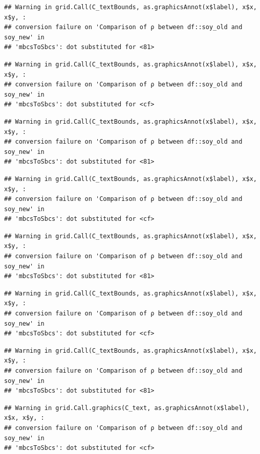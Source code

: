 \documentclass[
]{book}
\begin{document}
\begin{verbatim}
## Warning in grid.Call(C_textBounds, as.graphicsAnnot(x$label), x$x, x$y, :
## conversion failure on 'Comparison of ρ between df::soy_old and soy_new' in
## 'mbcsToSbcs': dot substituted for <81>
\end{verbatim}

\begin{verbatim}
## Warning in grid.Call(C_textBounds, as.graphicsAnnot(x$label), x$x, x$y, :
## conversion failure on 'Comparison of ρ between df::soy_old and soy_new' in
## 'mbcsToSbcs': dot substituted for <cf>
\end{verbatim}

\begin{verbatim}
## Warning in grid.Call(C_textBounds, as.graphicsAnnot(x$label), x$x, x$y, :
## conversion failure on 'Comparison of ρ between df::soy_old and soy_new' in
## 'mbcsToSbcs': dot substituted for <81>
\end{verbatim}

\begin{verbatim}
## Warning in grid.Call(C_textBounds, as.graphicsAnnot(x$label), x$x, x$y, :
## conversion failure on 'Comparison of ρ between df::soy_old and soy_new' in
## 'mbcsToSbcs': dot substituted for <cf>
\end{verbatim}

\begin{verbatim}
## Warning in grid.Call(C_textBounds, as.graphicsAnnot(x$label), x$x, x$y, :
## conversion failure on 'Comparison of ρ between df::soy_old and soy_new' in
## 'mbcsToSbcs': dot substituted for <81>
\end{verbatim}

\begin{verbatim}
## Warning in grid.Call(C_textBounds, as.graphicsAnnot(x$label), x$x, x$y, :
## conversion failure on 'Comparison of ρ between df::soy_old and soy_new' in
## 'mbcsToSbcs': dot substituted for <cf>
\end{verbatim}

\begin{verbatim}
## Warning in grid.Call(C_textBounds, as.graphicsAnnot(x$label), x$x, x$y, :
## conversion failure on 'Comparison of ρ between df::soy_old and soy_new' in
## 'mbcsToSbcs': dot substituted for <81>
\end{verbatim}

\begin{verbatim}
## Warning in grid.Call.graphics(C_text, as.graphicsAnnot(x$label), x$x, x$y, :
## conversion failure on 'Comparison of ρ between df::soy_old and soy_new' in
## 'mbcsToSbcs': dot substituted for <cf>
\end{verbatim}
\end{document}
